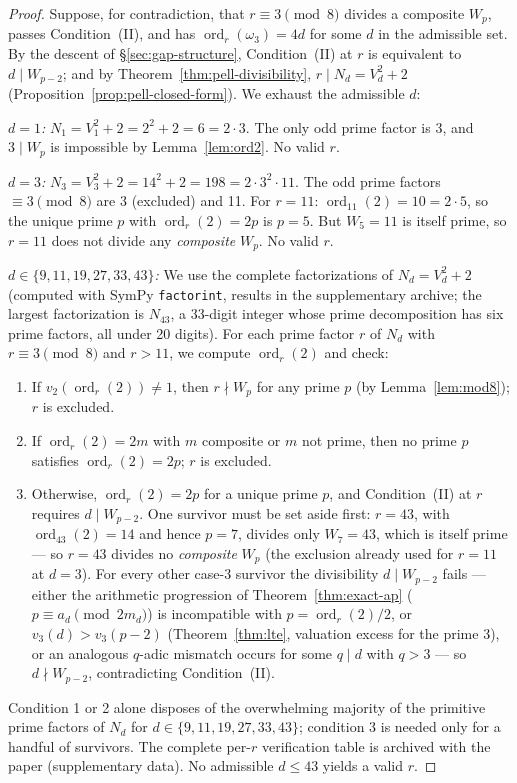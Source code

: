 \documentclass[11pt]{amsart}
\theoremstyle{plain}
\theoremstyle{definition}
\theoremstyle{remark}
\numberwithin{equation}{section}
\newcommand{\ord}{\operatorname{ord}}
\begin{document}
\begin{proof}
Suppose, for contradiction, that $r \equiv 3 \pmod 8$ divides a composite $W_p$, passes Condition~(II), and has $\ord_r(\omega_3) = 4 d$ for some $d$ in the admissible set. By the descent of \S\ref{sec:gap-structure}, Condition~(II) at $r$ is equivalent to $d \mid W_{p-2}$; and by Theorem~\ref{thm:pell-divisibility}, $r \mid N_d = V_d^2 + 2$ (Proposition~\ref{prop:pell-closed-form}). We exhaust the admissible $d$:

\emph{$d = 1$:} $N_1 = V_1^2 + 2 = 2^2 + 2 = 6 = 2 \cdot 3$. The only odd prime factor is 3, and $3 \mid W_p$ is impossible by Lemma~\ref{lem:ord2}. No valid $r$.

\emph{$d = 3$:} $N_3 = V_3^2 + 2 = 14^2 + 2 = 198 = 2 \cdot 3^2 \cdot 11$. The odd prime factors $\equiv 3 \pmod 8$ are 3 (excluded) and 11. For $r = 11$: $\ord_{11}(2) = 10 = 2 \cdot 5$, so the unique prime $p$ with $\ord_r(2) = 2 p$ is $p = 5$. But $W_5 = 11$ is itself prime, so $r = 11$ does not divide any \emph{composite} $W_p$. No valid $r$.

\emph{$d \in \{9, 11, 19, 27, 33, 43\}$:} We use the complete factorizations of $N_d = V_d^2 + 2$ (computed with SymPy \texttt{factorint}, results in the supplementary archive; the largest factorization is $N_{43}$, a 33-digit integer whose prime decomposition has six prime factors, all under 20 digits). For each prime factor $r$ of $N_d$ with $r \equiv 3 \pmod 8$ and $r > 11$, we compute $\ord_r(2)$ and check:
\begin{enumerate}
\item If $v_2(\ord_r(2)) \neq 1$, then $r \nmid W_p$ for any prime $p$ (by Lemma~\ref{lem:mod8}); $r$ is excluded.
\item If $\ord_r(2) = 2 m$ with $m$ composite or $m$ not prime, then no prime $p$ satisfies $\ord_r(2) = 2 p$; $r$ is excluded.
\item Otherwise, $\ord_r(2) = 2 p$ for a unique prime $p$, and Condition~(II) at $r$ requires $d \mid W_{p-2}$. One survivor must be set aside first: $r = 43$, with $\ord_{43}(2) = 14$ and hence $p = 7$, divides only $W_7 = 43$, which is itself prime --- so $r = 43$ divides no \emph{composite} $W_p$ (the exclusion already used for $r = 11$ at $d = 3$). For every other case-3 survivor the divisibility $d \mid W_{p-2}$ fails --- either the arithmetic progression of Theorem~\ref{thm:exact-ap} ($p \equiv a_d \pmod{2 m_d}$) is incompatible with $p = \ord_r(2)/2$, or $v_3(d) > v_3(p-2)$ (Theorem~\ref{thm:lte}, valuation excess for the prime 3), or an analogous $q$-adic mismatch occurs for some $q \mid d$ with $q > 3$ --- so $d \nmid W_{p-2}$, contradicting Condition~(II).
\end{enumerate}
Condition 1 or 2 alone disposes of the overwhelming majority of the primitive prime factors of $N_d$ for $d \in \{9, 11, 19, 27, 33, 43\}$; condition 3 is needed only for a handful of survivors. The complete per-$r$ verification table is archived with the paper (supplementary data). No admissible $d \leq 43$ yields a valid $r$.


\end{proof}
\end{document}
